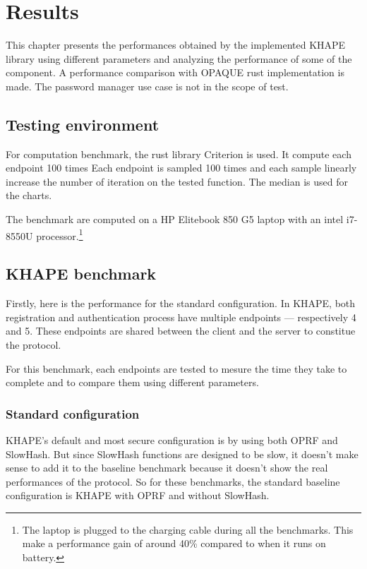 \documentclass[../report.tex]{subfiles}
\begin{document}

\chapter{Results} %

This chapter presents the performances obtained by the implemented KHAPE library using different parameters and analyzing the performance of some of the component. A performance comparison with OPAQUE rust implementation \cite{opaque-ke} is made. The password manager use case is not in the scope of test.

\section{Testing environment}

For computation benchmark, the rust library Criterion is used. It compute each endpoint 100 times
Each endpoint is sampled 100 times and each sample linearly increase the number of iteration on the tested function.
The median is used for the charts.

The benchmark are computed on a HP Elitebook 850 G5 laptop with an intel i7-8550U processor.\footnote{The laptop is plugged to the charging cable during all the benchmarks. This make a performance gain of around 40\% compared to when it runs on battery.} 


\section{KHAPE benchmark} %

Firstly, here is the performance for the standard configuration.
In KHAPE, both registration and authentication process have multiple endpoints --- respectively 4 and 5. These endpoints are shared between the client and the server to constitue the protocol.

For this benchmark, each endpoints are tested to mesure the time they take to complete and to compare them using different parameters.


\subsection{Standard configuration}
KHAPE's default and most secure configuration is by using both OPRF and SlowHash. 
But since SlowHash functions are designed to be slow, it doesn't make sense to add it to the baseline benchmark because it doesn't show the real performances of the protocol.
So for these benchmarks, the standard baseline configuration is KHAPE with OPRF and without SlowHash.
\end{document}
